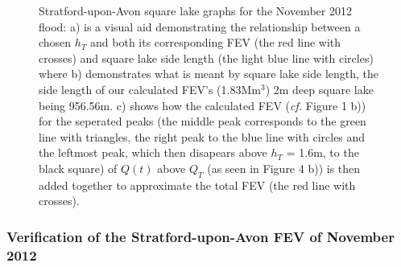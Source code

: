 \documentclass[11pt,a4paper]{article}
\begin{document}
\begin{figure}[H]
\centering
{}
\hfill
{}
\caption{Stratford-upon-Avon square lake graphs for the November 2012 flood: a) is a visual aid demonstrating the relationship between a chosen $h_T$ and both its corresponding FEV (the red line with crosses) and square lake side length (the light blue line with circles) where b) demonstrates what is meant by square lake side length, the side length of our calculated FEV's (1.83Mm$^3$) 2m deep square lake being 956.56m. c) shows how the calculated FEV (\textit{cf.} Figure 1 b)) for the seperated peaks (the middle peak corresponds to the green line with triangles, the right peak to the blue line with circles and the leftmost peak, which then disapears above $h_T$ = 1.6m, to the black square) of $Q(t)$ above $Q_T$ (as seen in Figure 4 b)) is then added together to approximate the total FEV (the red line with crosses).}
\end{figure}

\subsubsection{Verification of the Stratford-upon-Avon FEV of November 2012}
\end{document}
